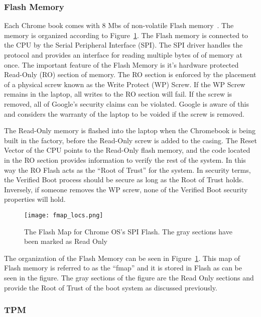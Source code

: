 \documentclass[../report.tex]{subfiles}
\begin{document}
\subsubsection{Flash Memory}

Each Chrome book comes with 8 Mbs of non-volatile Flash memory~\cite{fw-summit}.
The memory is organized according to Figure~\ref{fig:fmap}. 
The Flash memory is connected to the CPU by the Serial Peripheral Interface (SPI).
The SPI driver handles the protocol and provides an interface for reading multiple bytes of of memory at once.
The important feature of the Flash Memory is it's hardware protected Read-Only (RO) section of memory.
The RO section is enforced by the placement of a physical screw known as the Write Protect (WP) Screw.
If the WP Screw remains in the laptop, all writes to the RO section will fail.
If the screw is removed, all of Google's security claims can be violated. 
Google is aware of this and considers the warranty of the laptop to be voided if the screw is removed.

The Read-Only memory is flashed into the laptop when the Chromebook is being built in the factory, before the Read-Only screw is added to the casing. 
The Reset Vector of the CPU points to the Read-Only flash memory, and the code located in the RO section provides information to verify the rest of the system.
In this way the RO Flash acts as the ``Root of Trust'' for the system.
In security terms, the Verified Boot process should be secure as long as the Root of Trust holds.
Inversely, if someone removes the WP screw, none of the Verified Boot security properties will hold.

\begin{figure}
  \centering
  \texttt{[image: fmap\_locs.png]}
  \caption{The Flash Map for Chrome OS's SPI Flash. The gray sections have been marked as Read Only~\cite{fw-summit}}
  \label{fig:fmap}
\end{figure}

The organization of the Flash Memory can be seen in Figure~\ref{fig:fmap}.
This map of Flash memory is referred to as the ``fmap'' and it is stored in Flash as can be seen in the figure.
The gray sections of the figure are the Read Only sections and provide the Root of Trust of the boot system as discussed previously.

\subsubsection{TPM}
\end{document}
